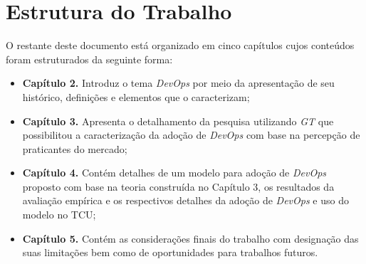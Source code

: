 \section{Estrutura do Trabalho}

O restante deste documento está organizado em cinco capítulos cujos conteúdos
foram estruturados da seguinte forma:

\begin{itemize}
\item \textbf{Capítulo 2.} Introduz o tema \textit{DevOps} por meio da
apresentação de seu histórico, definições e elementos que o caracterizam;
\item \textbf{Capítulo 3.} Apresenta o detalhamento da pesquisa utilizando
\textit{\acrfull{GT}} que possibilitou a caracterização da adoção de
\textit{DevOps} com base na percepção de praticantes do mercado;
\item \textbf{Capítulo 4.} Contém detalhes de um modelo para adoção de
\textit{DevOps} proposto com base na teoria construída no Capítulo 3, os
resultados da avaliação empírica e os respectivos detalhes da adoção de {\it DevOps}
e uso do modelo no \acrshort{TCU};
\item \textbf{Capítulo 5.} Contém as considerações finais do trabalho com
designação das suas limitações bem como de oportunidades para trabalhos futuros.
\end{itemize}




